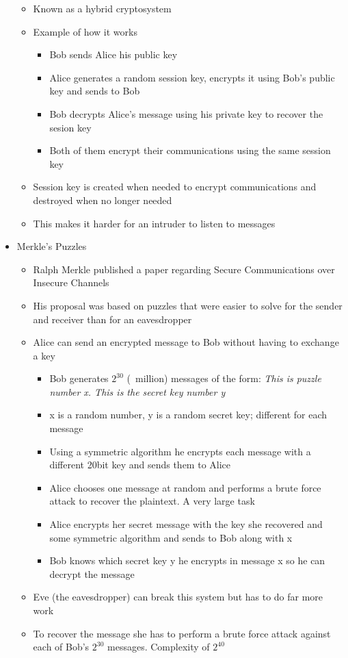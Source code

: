 \documentclass[]{article}
\begin{document}
\begin{itemize}
\begin{itemize}
        \item Known as a hybrid cryptosystem
        \item Example of how it works
        \begin{itemize}
            \item Bob sends Alice his public key
            \item Alice generates a random session key, encrypts it using Bob's public key and sends to Bob
            \item Bob decrypts Alice's message using his private key to recover the sesion key
            \item Both of them encrypt their communications using the same session key
        \end{itemize}
        \item Session key is created when needed to encrypt communications and destroyed when no longer needed
        \item This makes it harder for an intruder to listen to messages
    \end{itemize}
    \item Merkle's Puzzles
    \begin{itemize}
        \item Ralph Merkle published a paper regarding Secure Communications over Insecure Channels
        \item His proposal was based on puzzles that were easier to solve for the sender and receiver than for an eavesdropper
        \item Alice can send an encrypted message to Bob without having to exchange a key
        \begin{itemize}
            \item Bob generates $2^{30}$ (~million) messages of the form: \textit{This is puzzle number x. This is the secret key number y}
            \item x is a random number, y is a random secret key; different for each message
            \item Using a symmetric algorithm he encrypts each message with a different 20bit key and sends them to Alice
            \item Alice chooses one message at random and performs a brute force attack to recover the plaintext. A very large task
            \item Alice encrypts her secret message with the key she recovered and some symmetric algorithm and sends to Bob along with x
            \item Bob knows which secret key y he encrypts in message x so he can decrypt the message
        \end{itemize}
        \item Eve (the eavesdropper) can break this system but has to do far more work
        \item To recover the message she has to perform a brute force attack against each of Bob's $2^{30}$ messages. Complexity of $2^{40}$
    \end{itemize}
\end{itemize}
\end{document}

